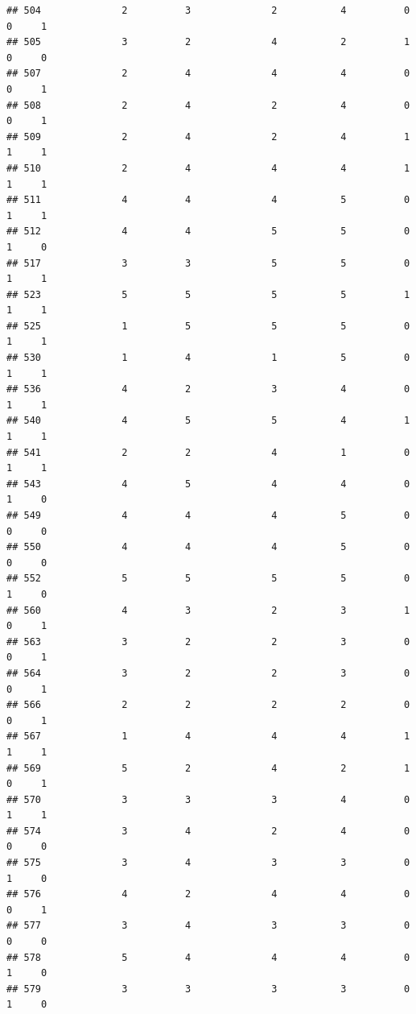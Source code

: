 \documentclass[
]{article}
\begin{document}
\begin{verbatim}
## 504              2          3              2           4          0    0     1
## 505              3          2              4           2          1    0     0
## 507              2          4              4           4          0    0     1
## 508              2          4              2           4          0    0     1
## 509              2          4              2           4          1    1     1
## 510              2          4              4           4          1    1     1
## 511              4          4              4           5          0    1     1
## 512              4          4              5           5          0    1     0
## 517              3          3              5           5          0    1     1
## 523              5          5              5           5          1    1     1
## 525              1          5              5           5          0    1     1
## 530              1          4              1           5          0    1     1
## 536              4          2              3           4          0    1     1
## 540              4          5              5           4          1    1     1
## 541              2          2              4           1          0    1     1
## 543              4          5              4           4          0    1     0
## 549              4          4              4           5          0    0     0
## 550              4          4              4           5          0    0     0
## 552              5          5              5           5          0    1     0
## 560              4          3              2           3          1    0     1
## 563              3          2              2           3          0    0     1
## 564              3          2              2           3          0    0     1
## 566              2          2              2           2          0    0     1
## 567              1          4              4           4          1    1     1
## 569              5          2              4           2          1    0     1
## 570              3          3              3           4          0    1     1
## 574              3          4              2           4          0    0     0
## 575              3          4              3           3          0    1     0
## 576              4          2              4           4          0    0     1
## 577              3          4              3           3          0    0     0
## 578              5          4              4           4          0    1     0
## 579              3          3              3           3          0    1     0

\end{verbatim}
\end{document}
